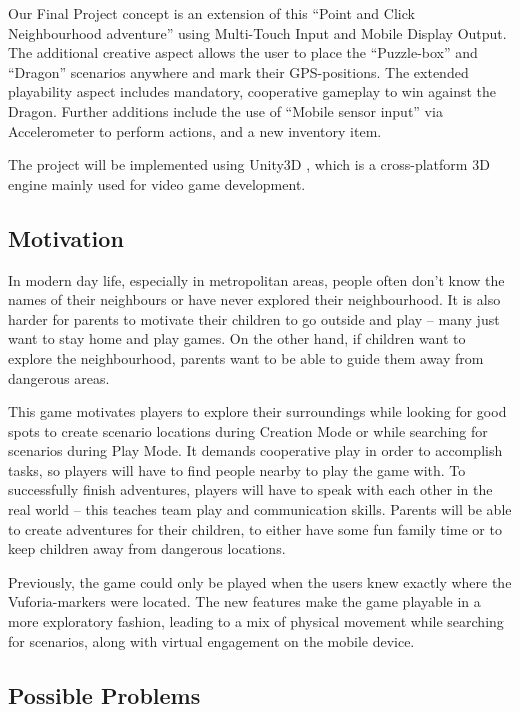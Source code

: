 \documentclass{sigchi-ext}
\begin{document}
Our Final Project concept is an extension of this ``Point and Click Neighbourhood adventure'' using Multi-Touch Input and Mobile Display Output. The additional creative aspect allows the user to place the ``Puzzle-box'' and ``Dragon'' scenarios anywhere and  mark their GPS-positions. The extended playability aspect includes mandatory, cooperative gameplay to win against the Dragon. Further additions include the use of ``Mobile sensor input'' via Accelerometer to perform actions, and a new inventory item.

The project will be implemented using Unity3D \cite{unity3d}, which is a cross-platform 3D engine mainly used for video game development. 

\subsection{Motivation}

In modern day life, especially in metropolitan areas, people often don't know the names of their neighbours or have never explored their neighbourhood. It is also harder for parents to motivate their children to go outside and play -- many just want to stay home and play games. On the other hand, if children want to explore the neighbourhood, parents want to be able to guide them away from dangerous areas.

This game motivates players to explore their surroundings while looking for good spots to create scenario locations during Creation Mode or while searching for scenarios during Play Mode. It demands cooperative play in order to accomplish tasks, so players will have to find people nearby to play the game with. To successfully finish adventures, players will have to speak with each other in the real world -- this teaches team play and communication skills. Parents will be able to create adventures for their children, to either have some fun family time or to keep children away from dangerous locations.

Previously, the game could only be played when the users knew exactly where the Vuforia-markers were located. The new features make the game playable in a more exploratory fashion, leading to a mix of physical movement while searching for scenarios, along with virtual engagement on the mobile device. 

\subsection{Possible Problems}
\end{document}
